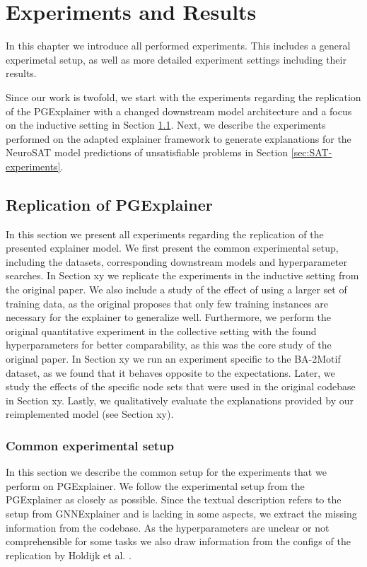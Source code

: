 \chapter{Experiments and Results}
\label{ch:Experiments}

In this chapter we introduce all performed experiments. This includes a general experimetal setup, as well as more detailed experiment settings including their results.

Since our work is twofold, we start with the experiments regarding the replication of the PGExplainer with a changed downstream model architecture and a focus on the inductive setting in Section \ref{sec:experiments_replication}. Next, we describe the experiments performed on the adapted explainer framework to generate explanations for the NeuroSAT model predictions of unsatisfiable problems in Section \ref{sec:SAT-experiments}.

\section{Replication of PGExplainer}
\label{sec:experiments_replication}
In this section we present all experiments regarding the replication of the presented explainer model. We first present the common experimental setup, including the datasets, corresponding downstream models and hyperparameter searches. In Section xy we replicate the experiments in the inductive setting from the original paper. We also include a study of the effect of using a larger set of training data, as the original proposes that only few training instances are necessary for the explainer to generalize well. Furthermore, we perform the original quantitative experiment in the collective setting with the found hyperparameters for better comparability, as this was the core study of the original paper. In Section xy we run an experiment specific to the BA-2Motif dataset, as we found that it behaves opposite to the expectations. Later, we study the effects of the specific node sets that were used in the original codebase in Section xy. Lastly, we qualitatively evaluate the explanations provided by our reimplemented model (see Section xy).

\subsection{Common experimental setup}
\label{sec:PGE_exp_setup}
In this section we describe the common setup for the experiments that we perform on PGExplainer.
We follow the experimental setup from the PGExplainer as closely as possible. Since the textual description refers to the setup from GNNExplainer and is lacking in some aspects, we extract the missing information from the codebase. As the hyperparameters are unclear or not comprehensible for some tasks we also draw information from the configs of the replication by Holdijk et al. \cite{holdijk2021re}.

